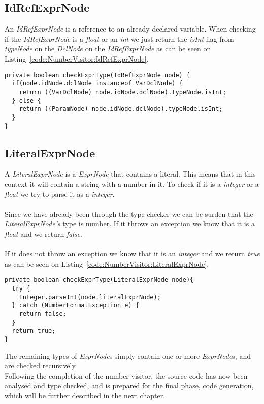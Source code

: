 \subsection{IdRefExprNode}
An \textit{IdRefExprNode} is a reference to an already declared variable. 
When checking if the \textit{IdRefExprNode} is a \textit{float} or an \textit{int} we just return the \textit{isInt} flag from \textit{typeNode} on the \textit{DclNode} on the \textit{IdRefExprNode} as can be seen on Listing~\ref{code:NumberVisitor:IdRefExprNode}.
\begin{lstlisting}[caption={This listing shows the checkExprType method}, label={code:NumberVisitor:IdRefExprNode}]
private boolean checkExprType(IdRefExprNode node) {
  if(node.idNode.dclNode instanceof VarDclNode) {
    return ((VarDclNode) node.idNode.dclNode).typeNode.isInt;
  } else {
    return ((ParamNode) node.idNode.dclNode).typeNode.isInt;
  }
}
\end{lstlisting}

\subsection{LiteralExprNode}
A \textit{LiteralExprNode} is a \textit{ExprNode} that contains a literal. 
This means that in this context it will contain a string with a number in it. 
To check if it is a \textit{integer} or a \textit{float} we try to parse it as a \textit{integer}. 
\\\\
Since we have already been through the type checker we can be surden that the \textit{LiteralExprNode's} type is number.
If it throws an exception we know that it is a \textit{float} and we return \textit{false}.
\\\\
If it does not throw an exception we know that it is an \textit{integer} and we return \textit{true} as can be seen on Listing~\ref{code:NumberVisitor:LiteralExprNode}.
\begin{lstlisting}[caption={Code to implement the checkExprType method that takes a LiteralExprNode as a parameter}, label={code:NumberVisitor:LiteralExprNode}]
private boolean checkExprType(LiteralExprNode node){
  try {
    Integer.parseInt(node.literalExprNode);
  } catch (NumberFormatException e) {
    return false;
  }
  return true;
}
\end{lstlisting}
The remaining types of \textit{ExprNode}s simply contain one or more \textit{ExprNode}s, and are checked recursively. \\
Following the completion of the number visitor, the source code has now been analysed and type checked, and is prepared for the final phase, code generation, which will be further described in the next chapter.